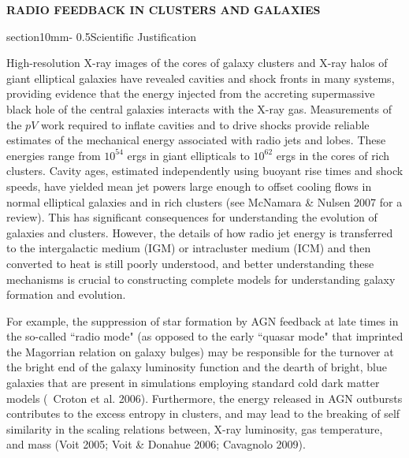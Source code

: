 \documentclass[letterpaper,11pt]{article}
\makeatletter
\renewcommand{\section}{\@startsection%
{section}{1}{0mm}{-\baselineskip}%
{0.5\baselineskip}{\normalfont\Large\bfseries}}%
\makeatother
\begin{document}
\pagestyle{plain}

\begin{center}
\bfseries\uppercase{Radio Feedback in Clusters and Galaxies}
\end{center}

\section{Scientific Justification}

High-resolution X-ray images of the cores of galaxy clusters and X-ray
halos of giant elliptical galaxies have revealed cavities and shock
fronts in many systems, providing evidence that the energy injected
from the accreting supermassive black hole of the central galaxies
interacts with the X-ray gas. Measurements of the $pV$ work required
to inflate cavities and to drive shocks provide reliable estimates of
the mechanical energy associated with radio jets and lobes. These
energies range from $10^54$ ergs in giant ellipticals to $10^62$ ergs
in the cores of rich clusters. Cavity ages, estimated independently
using buoyant rise times and shock speeds, have yielded mean jet
powers large enough to offset cooling flows in normal elliptical
galaxies and in rich clusters (see McNamara \& Nulsen 2007 for a
review). This has significant consequences for understanding the
evolution of galaxies and clusters. However, the details of how radio
jet energy is transferred to the intergalactic medium (IGM) or
intracluster medium (ICM) and then converted to heat is still poorly
understood, and better understanding these mechanisms is crucial to
constructing complete models for understanding galaxy formation and
evolution.

For example, the suppression of star formation by AGN feedback at late
times in the so-called ``radio mode" (as opposed to the early ``quasar
mode" that imprinted the Magorrian relation on galaxy bulges) may be
responsible for the turnover at the bright end of the galaxy
luminosity function and the dearth of bright, blue galaxies that are
present in simulations employing standard cold dark matter models
(\eg\ Croton et al. 2006). Furthermore, the energy released in AGN
outbursts contributes to the excess entropy in clusters, and may lead
to the breaking of self similarity in the scaling relations between,
X-ray luminosity, gas temperature, and mass (Voit 2005; Voit \& Donahue
2006; Cavagnolo 2009).
\end{document}
